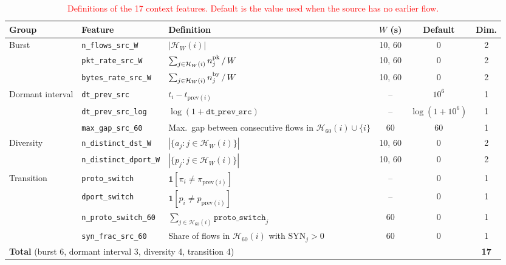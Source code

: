 \documentclass[conference]{IEEEtran}
\begin{document}
\begin{table}[!t]
\centering
\scriptsize
\caption{\textcolor{red}{Definitions of the 17 context
features. Default is the value used when the source has no earlier
flow.}}
\label{tab:context_features}
\color{red}
\setlength{\tabcolsep}{6pt}
\renewcommand{\arraystretch}{1.25}
\begin{tabular}{l l >{\raggedright\arraybackslash}p{4.3cm} c c c}
\hline\toprule
\textbf{Group} & \textbf{Feature} & \textbf{Definition} & \textbf{$W$ (s)} & \textbf{Default} & \textbf{Dim.} \\
\hline\toprule
\multirow{3}{*}{Burst}
 & \texttt{n\_flows\_src\_W}    & $|\mathcal{H}_W(i)|$ & 10, 60 & 0 & 2 \\
 & \texttt{pkt\_rate\_src\_W}   & $\sum_{j\in\mathcal{H}_W(i)} n^{\rm pk}_j \,/\, W$ & 10, 60 & 0 & 2 \\
 & \texttt{bytes\_rate\_src\_W} & $\sum_{j\in\mathcal{H}_W(i)} n^{\rm by}_j \,/\, W$ & 10, 60 & 0 & 2 \\
\midrule
\multirow{3}{*}{Dormant interval}
 & \texttt{dt\_prev\_src}     & $t_i-t_{\mathrm{prev}(i)}$ & -- & $10^{6}$ & 1 \\
 & \texttt{dt\_prev\_src\_log} & $\log(1+\texttt{dt\_prev\_src})$ & -- & $\log(1+10^{6})$ & 1 \\
 & \texttt{max\_gap\_src\_60}  & Max.\ gap between consecutive flows in $\mathcal{H}_{60}(i)\cup\{i\}$ & 60 & 60 & 1 \\
\midrule
\multirow{2}{*}{Diversity}
 & \texttt{n\_distinct\_dst\_W}   & $|\{a_j: j\in\mathcal{H}_W(i)\}|$ & 10, 60 & 0 & 2 \\
 & \texttt{n\_distinct\_dport\_W} & $|\{p_j: j\in\mathcal{H}_W(i)\}|$ & 10, 60 & 0 & 2 \\
\midrule
\multirow{4}{*}{Transition}
 & \texttt{proto\_switch}       & $\mathbf{1}[\pi_i\neq\pi_{\mathrm{prev}(i)}]$ & -- & 0 & 1 \\
 & \texttt{dport\_switch}       & $\mathbf{1}[p_i\neq p_{\mathrm{prev}(i)}]$ & -- & 0 & 1 \\
 & \texttt{n\_proto\_switch\_60} & $\sum_{j\in\mathcal{H}_{60}(i)} \texttt{proto\_switch}_j$ & 60 & 0 & 1 \\
 & \texttt{syn\_frac\_src\_60}  & Share of flows in $\mathcal{H}_{60}(i)$ with $\mathrm{SYN}_j>0$ & 60 & 0 & 1 \\
\midrule
\multicolumn{5}{l}{\textbf{Total} (burst 6, dormant interval 3, diversity 4, transition 4)} & \textbf{17} \\
\hline\toprule
\end{tabular}
\end{table}
\end{document}
